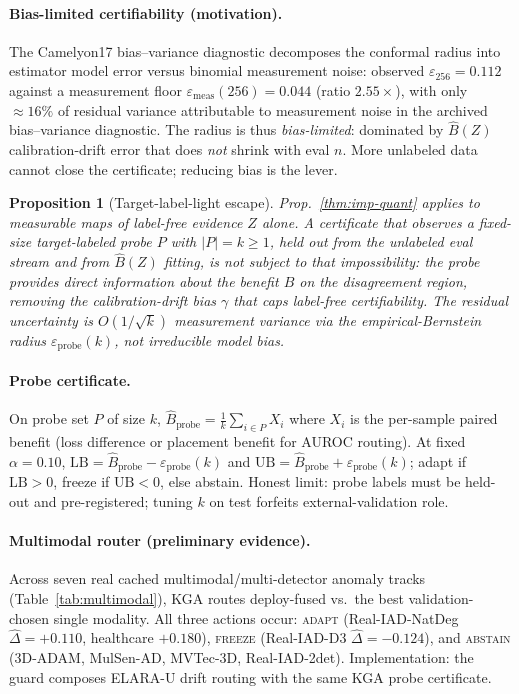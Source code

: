 \documentclass[conference]{IEEEtran}
\theoremstyle{plain}
\newtheorem{proposition}{Proposition}
\theoremstyle{definition}
\begin{document}
\paragraph{Bias-limited certifiability (motivation).}
The Camelyon17 bias--variance diagnostic decomposes the conformal radius into estimator model error
versus binomial measurement noise: observed $\varepsilon_{256}{=}0.112$ against a measurement floor
$\varepsilon_{\mathrm{meas}}(256){=}0.044$ (ratio $2.55{\times}$), with only $\approx\!16\%$ of
residual variance attributable to measurement noise
in the archived bias--variance diagnostic. The radius is thus
\emph{bias-limited}: dominated by $\widehat{B}(Z)$ calibration-drift error that does \emph{not}
shrink with eval $n$. More unlabeled data cannot close the certificate; reducing bias is the lever.

\begin{proposition}[Target-label-light escape]\label{prop:tll-escape}
Prop.~\ref{thm:imp-quant} applies to measurable maps of label-free evidence $Z$ alone. A certificate
that observes a fixed-size target-labeled probe $P$ with $|P|{=}k{\ge}1$, held out from the unlabeled
eval stream and from $\widehat{B}(Z)$ fitting, is not subject to that impossibility: the probe
provides direct information about the benefit $B$ on the disagreement region, removing the
calibration-drift bias $\gamma$ that caps label-free certifiability. The residual uncertainty is
$O(1/\sqrt{k})$ measurement variance via the empirical-Bernstein radius $\varepsilon_{\mathrm{probe}}(k)$,
not irreducible model bias.
\end{proposition}

\paragraph{Probe certificate.}
On probe set $P$ of size $k$,
$\widehat{B}_{\mathrm{probe}}{=}\frac{1}{k}\sum_{i\in P} X_i$ where $X_i$ is the per-sample paired
benefit (loss difference or placement benefit for AUROC routing). At fixed $\alpha{=}0.10$,
$\mathrm{LB}{=}\widehat{B}_{\mathrm{probe}}{-}\varepsilon_{\mathrm{probe}}(k)$ and
$\mathrm{UB}{=}\widehat{B}_{\mathrm{probe}}{+}\varepsilon_{\mathrm{probe}}(k)$; adapt if
$\mathrm{LB}{>}0$, freeze if $\mathrm{UB}{<}0$, else abstain. Honest limit: probe labels must be
held-out and pre-registered; tuning $k$ on test forfeits external-validation role.

\paragraph{Multimodal router (preliminary evidence).}
Across seven real cached multimodal/multi-detector anomaly tracks
(Table~\ref{tab:multimodal}), \textsc{KGA} routes deploy-fused vs.\ the best validation-chosen
single modality. All three actions occur: \textsc{adapt} (Real-IAD-NatDeg $\hat\Delta{=}{+}0.110$,
healthcare ${+}0.180$), \textsc{freeze} (Real-IAD-D3 $\hat\Delta{=}{-}0.124$), and \textsc{abstain}
(3D-ADAM, MulSen-AD, MVTec-3D, Real-IAD-2det). Implementation:
the guard composes ELARA-U drift routing with the same \textsc{KGA} probe certificate.
\end{document}
